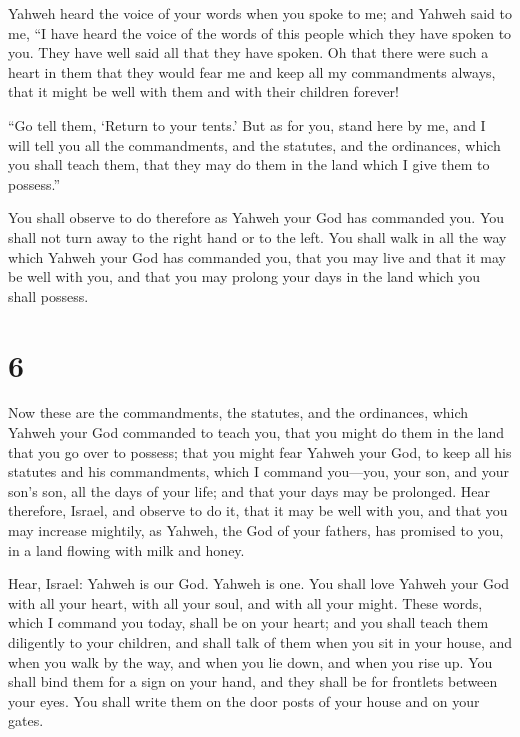  Yahweh heard the voice of your words when you spoke to
me; and Yahweh said to me, ``I have heard the voice of the words of this
people which they have spoken to you. They have well said all that they
have spoken.  Oh that there were such a heart in them
that they would fear me and keep all my commandments always, that it
might be well with them and with their children forever!

 ``Go tell them, `Return to your tents.' 
But as for you, stand here by me, and I will tell you all the
commandments, and the statutes, and the ordinances, which you shall
teach them, that they may do them in the land which I give them to
possess.''

 You shall observe to do therefore as Yahweh your God has
commanded you. You shall not turn away to the right hand or to the left.
 You shall walk in all the way which Yahweh your God has
commanded you, that you may live and that it may be well with you, and
that you may prolong your days in the land which you shall possess.

\hypertarget{section-5}{%
\section{6}\label{section-5}}

 Now these are the commandments, the statutes, and the
ordinances, which Yahweh your God commanded to teach you, that you might
do them in the land that you go over to possess;  that you
might fear Yahweh your God, to keep all his statutes and his
commandments, which I command you---you, your son, and your son's son,
all the days of your life; and that your days may be prolonged.
 Hear therefore, Israel, and observe to do it, that it may
be well with you, and that you may increase mightily, as Yahweh, the God
of your fathers, has promised to you, in a land flowing with milk and
honey.

 Hear, Israel: Yahweh is our God. Yahweh is one.
 You shall love Yahweh your God with all your heart, with
all your soul, and with all your might.  These words,
which I command you today, shall be on your heart;  and
you shall teach them diligently to your children, and shall talk of them
when you sit in your house, and when you walk by the way, and when you
lie down, and when you rise up.  You shall bind them for a
sign on your hand, and they shall be for frontlets between your eyes.
 You shall write them on the door posts of your house and
on your gates.

